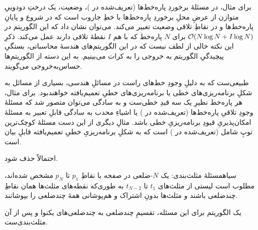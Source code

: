 برای مثال، در مسئلهٔ برخوردِ پاره‌خط‌ها (تعریف‌شده در )، وضعیت، یک درختِ دودوییِ متوازن از عرضِ محلِ برخوردِ پاره‌خط‌ها با خطِ جاروب است که در شروع و پایانِ پاره‌خط‌ها و در نقاطِ تلاقی وضعیت تغییر می‌کند. می‌توان نشان داد که این الگوریتم در 
$\mathcal{O}(N \log N + I \log N)$
برای $N$ پاره‌خط که با هم $I$ نقطهٔ تلاقی دارند عمل می‌کند. ذکرِ این نکته خالی از لطف نیست که در این الگوریتم‌های هندسهٔ محاسباتی، بستگیِ پیچیدگیِ الگوریتم به خروجی را به کرات می‌بینیم. به این دسته از الگوریتم‌ها حساس‌به‌خروجی 
 می‌گویند.
 
طبیعی‌ست که به دلیلِ وجودِ خط‌های راست در مسائلِ هندسی، بسیاری از مسائل به شکلِ برنامه‌ریزی‌های خطی یا برنامه‌ریزی‌های خطیِ تعمیم‌یافته
 خواهندبود.
برای مثال، هر پاره‌خط نظیرِ یک سه قیدِ خطی‌ست و به سادگی می‌توان متصور شد که مسئلهٔ وجودِ تلاقیِ پاره‌خط‌ها  (تعریف‌شده در ) یا اشیاءِ محدب به سادگی قابلِ تعبیر به مسئلهٔ امکان‌پذیریِ قیودِ برنامه‌ریزیِ خطی باشد. مثالِ دیگری از این دست مسئلهٔ کوچک‌ترین توپِ شامل (تعریف‌شده در ) است که به شکلِ برنامه‌ریزیِ خطیِ تعمیم‌یافته قابلِ بیان است.

احتمالاً حذف شود.

‌سیاه{مسئلهٔ مثلث‌بندی}: یک $N$-ضلعی در صفحه با نقاطِ $p_1$ تا $p_N$ مشخص شده‌اند، مطلوب است لیستی از مثلث‌های $t_1$ تا $t_{N-2}$ به طوری‌که نقطه‌های مثلث‌ها همان نقاطِ چندضلعی باشند و مثلث‌ها بدونِ اشتراک و هم‌پوشانی همهٔ چندضلعی را بپوشانند. 

یک الگوریتم برای این مسئله، تقسیمِ چندضلعی به چندضلعی‌های یکنوا و پس از آن مثلث‌بندی‌ست. 
  


